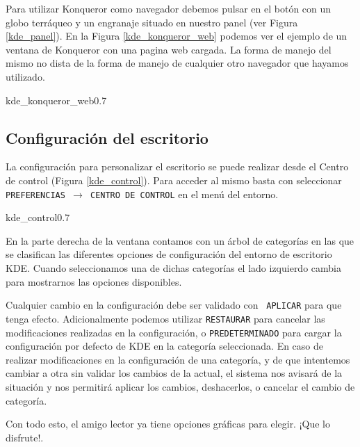 Para  utilizar {\sf  Konqueror} como  navegador debemos  pulsar en  el
botón con un  globo terráqueo y un engranaje situado  en nuestro panel
(ver  Figura \ref{kde_panel}).  En  la Figura  \ref{kde_konqueror_web}
podemos ver el ejemplo de un ventana de {\sf Konqueror} con una pagina
web cargada.  La forma  de manejo del  mismo no dista  de la  forma de
manejo de cualquier otro navegador que hayamos utilizado.

\begin{figura}{kde_konqueror_web}{0.7}
\caption{Konqueror como navegador web}
\label{kde_konqueror_web}
\end{figura}


\subsection{Configuración del escritorio}

La  configuración para  personalizar el  escritorio se  puede realizar
desde el {\sf Centro  de control} (Figura
\ref{kde_control}). Para  acceder al mismo basta  con seleccionar {\tt
PREFERENCIAS $\rightarrow$ CENTRO DE CONTROL} en el menú del entorno.

\begin{figura}{kde_control}{0.7}
\caption{Centro de control de {\sf KDE}}
\label{kde_control}
\end{figura}

En la parte derecha de la  ventana contamos con un árbol de categorías
en las que se clasifican  las diferentes opciones de configuración del
entorno de  escritorio {\sf KDE}.  Cuando seleccionamos una  de dichas
categorías  el  lado izquierdo  cambia  para  mostrarnos las  opciones
disponibles.

Cualquier  cambio  en la  configuración  debe  ser validado  con  {\tt
APLICAR}  para  que  tenga  efecto.  Adicionalmente  podemos  utilizar
{\tt  RESTAURAR} para  cancelar  las modificaciones  realizadas en  la
configuración, o {\tt PREDETERMINADO} para cargar la configuración por
defecto de {\sf KDE} en la categoría seleccionada. En caso de realizar
modificaciones  en  la  configuración  de  una  categoría,  y  de  que
intentemos cambiar  a otra sin  validar los  cambios de la  actual, el
sistema  nos avisará  de  la  situación y  nos  permitirá aplicar  los
cambios, deshacerlos, o cancelar el cambio de categoría.

Con todo esto, el amigo lector ya tiene opciones gráficas para elegir.
¡Que lo disfrute!.

